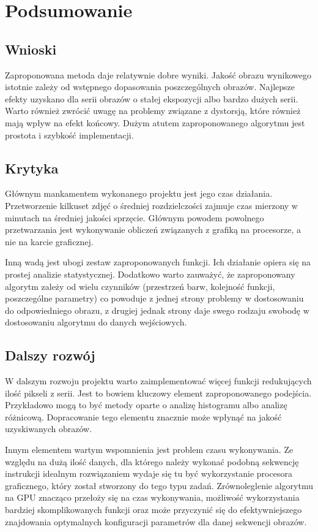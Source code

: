 \chapter{Podsumowanie}
\section{Wnioski}
Zaproponowana metoda daje relatywnie dobre wyniki. Jakość obrazu wynikowego istotnie zależy od wstępnego dopasowania poszczególnych obrazów. Najlepsze efekty uzyskano dla serii obrazów o stałej ekspozycji albo bardzo dużych serii. Warto również zwrócić uwagę na problemy związane z dystorsją, które również mają wpływ na efekt końcowy. Dużym atutem zaproponowanego algorytmu jest prostota i szybkość implementacji.

\section{Krytyka}
Głównym mankamentem wykonanego projektu jest jego czas działania. Przetworzenie kilkuset zdjęć o średniej rozdzielczości zajmuje czas mierzony w minutach na średniej jakości sprzęcie. Głównym powodem powolnego przetwarzania jest wykonywanie obliczeń związanych z grafiką na procesorze, a nie na karcie graficznej.

Inną wadą jest ubogi zestaw zaproponowanych funkcji. Ich działanie opiera się na prostej analizie statystycznej. Dodatkowo warto zauważyć, że zaproponowany algorytm zależy od wielu czynników (przestrzeń barw, kolejność funkcji, poszczególne parametry) co powoduje z jednej strony problemy w dostosowaniu do odpowiedniego obrazu, z drugiej jednak strony daje swego rodzaju swobodę w dostosowaniu algorytmu do danych wejściowych.

\section{Dalszy rozwój}
W dalszym rozwoju projektu warto zaimplementować więcej funkcji redukujących ilość pikseli z serii. Jest to bowiem kluczowy element zaproponowanego podejścia. Przykładowo mogą to być metody oparte o analizę histogramu albo analizę różnicową. Dopracowanie tego elementu znacznie może wpłynąć na jakość uzyskiwanych obrazów.

Innym elementem wartym wspomnienia jest problem czasu wykonywania. Ze względu na dużą ilość danych, dla którego należy wykonać podobną sekwencję instrukcji idealnym rozwiązaniem wydaje się tu być wykorzystanie procesora graficznego, który został stworzony do tego typu zadań. Zrównoleglenie algorytmu na GPU znacząco przełoży się na czas wykonywania, możliwość wykorzystania bardziej skomplikowanych funkcji oraz może przyczynić się do efektywniejszego znajdowania optymalnych konfiguracji parametrów dla danej sekwencji obrazów. 